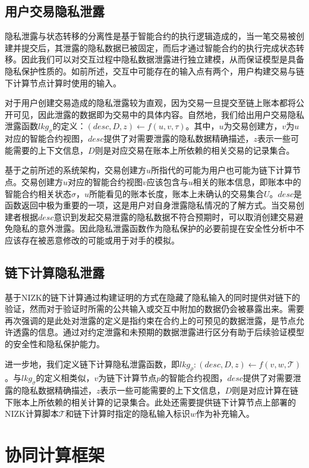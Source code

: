 \subsection{用户交易隐私泄露}
隐私泄露与状态转移的分离性是基于智能合约的执行逻辑造成的，当一笔交易被创建并提交后，其泄露的隐私数据已被固定，而后才通过智能合约的执行完成状态转移。因此我们可以对交互过程中隐私数据泄露进行独立建模，从而保证模型是具备隐私保护性质的。如前所述，交互中可能存在的输入点有两个，用户构建交易与链下计算节点计算时使用的输入。

对于用户创建交易造成的隐私泄露较为直观，因为交易一旦提交至链上账本都将公开可见，因此泄露的数据即为交易中的具体内容。自然地，我们给出用户交易隐私泄露函数${lkg}_\sigma$的定义：$(desc, D, z) \leftarrow f(u, v, \tau)$。其中，$u$为交易创建方，$v$为$u$对应的智能合约视图，$desc$提供了对需要泄露的隐私数据精确描述，$z$表示一些可能需要的上下文信息，$D$则是对应交易在账本上所依赖的相关交易的记录集合。

基于之前所述的系统架构，交易创建方$u$所指代的可能为用户也可能为链下计算节点。交易创建方$u$对应的智能合约视图$v$应该包含与$u$相关的账本信息，即账本中的智能合约相关状态$\sigma$，$u$所能看见的账本长度，账本上未确认的交易集合$U$。$desc$是函数返回中极为重要的一项，这是用户对自身泄露隐私情况的了解方式。当交易创建者根据$desc$意识到发起交易泄露的隐私数据不符合预期时，可以取消创建交易避免隐私的意外泄露。因此隐私泄露函数作为隐私保护的必要前提在安全性分析中不应该存在被恶意修改的可能或用于对手的模拟。
\subsection{链下计算隐私泄露}
基于NIZK的链下计算通过构建证明的方式在隐藏了隐私输入的同时提供对链下的验证，然而对于验证时所需的公共输入或交互中附加的数据仍会被暴露出来。需要再次强调的是此处对泄露的定义是指约束在合约上的可预见的数据泄露，是节点允许透露的信息。通过对约定泄露和未预期的数据泄露进行区分有助于后续验证模型的安全性和隐私保护能力。

进一步地，我们定义链下计算隐私泄露函数，即${lkg}_\rho:(desc, D, z) \leftarrow f(v, w, \mathcal{T})$。与${lkg}_\sigma$的定义相类似，$v$为链下计算节点$p$的智能合约视图，$desc$提供了对需要泄露的隐私数据精确描述，$z$表示一些可能需要的上下文信息，$D$则是对应计算在链下账本上所依赖的相关计算的记录集合。此处还需要提供链下计算节点上部署的NIZK计算脚本$\mathcal{T}$和链下计算时指定的隐私输入标识$w$作为补充输入。
\section{协同计算框架}
